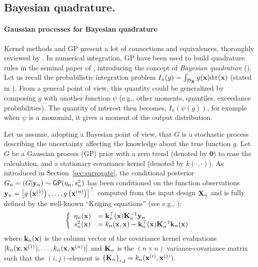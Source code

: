 
\subsection{Bayesian quadrature.}
\paragraph{Gaussian processes for Bayesian quadrature}%

Kernel methods and GP present a lot of connections and equivalences, thoroughly reviewed by \cite{kanagawa_2018}. 
In numerical integration, GP have been used to build quadrature rules in the seminal paper of \cite{ohagan_1991}, introducing the concept of \emph{Bayesian quadrature} (). 
Let us recall the probabilistic integration problem $I_\pi(g) = \int_{\mathcal{D}_{\bf X}} g({\bf x}) \mathrm{d} \pi({\bf x})$ (stated in ). 
From a general point of view, this quantity could be generalized by composing $g$ with another function $\psi$ (e.g., other moments, quantiles, exceedance probabilities). 
The quantity of interest then becomes, $I_\pi(\psi(g))$, for example when $\psi$ is a monomial, it gives a moment of the output distribution.

Let us assume, adopting a Bayesian point of view, that $G$ is a stochastic process describing the uncertainty affecting the knowledge about the true function $g$. 
Let $G$ be a Gaussian process (GP) prior with a zero trend (denoted by $\textbf{0}$) to ease the calculation, and a stationary covariance kernel (denoted by $k(\cdot, \cdot)$). 
As introduced in Section~\ref{sec:surrogate}, the conditional posterior $G_n = (G | {\bf y}_n) \sim \mathsf{GP}(\eta_n, s_n^2)$ has been conditioned on the function observations ${\bf y}_n = \left[g\left({\bf x}^{(1)}\right), \ldots, g\left({\bf x}^{(n)}\right)\right]^\top$ computed from the input design ${\bf X}_n$ and is fully defined by the well-known ``Kriging equations'' (see e.g., \citealp{rasmussen_2006}):
\begin{equation}
    \left\{
    \begin{array}{ll}
        \eta_n({\bf x}) &= {\bf k}_n^\top({\bf x}) {\bf K}_n^{-1} {\bf y}_n\\
        s_n^2({\bf x}) &= k_n({\bf x}, {\bf x}) - {\bf k}_n^\top({\bf x}) {\bf K}_n^{-1} {\bf k}_n({\bf x})
    \end{array}
\right.
\label{eq:kriging}
\end{equation}
where ${\bf k}_n({\bf x})$ is the column vector of the covariance kernel evaluations $[k_n({\bf x}, {\bf x}^{(1)}), \dots,\allowbreak k_n({\bf x}, {\bf x}^{(n)})]$ and ${\bf K}_n$ is the $(n \times n)$ variance-covariance matrix such that the $(i, j)$-element is $\left\{{\bf K}_n \right\}_{i, j}=k_n({\bf x}^{(i)}, {\bf x}^{(j)})$.

